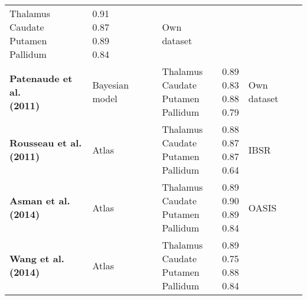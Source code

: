 \documentclass[twoside,fleqn,espcrc2]{elsarticle}
\begin{document}
\begin{table}[h!]
\begin{tabular}{lllll}
\parbox{1.5cm}{Thalamus \\ Caudate \\ Putamen \\ Pallidum  }   &
\parbox{1.0cm}{ 0.91\\0.87\\0.89\\0.84}   &
\parbox{2cm}{Own dataset}\\
\addlinespace
\parbox{3cm}{\textbf{Patenaude et al. \cite{patenaude2011bayesian} \\ (2011)}} &
\parbox{1.5cm}{Bayesian model} &
\parbox{1.5cm}{Thalamus \\ Caudate \\ Putamen \\ Pallidum  }   &
\parbox{1.0cm}{ 0.89\\0.83\\0.88\\0.79}   &
\parbox{2cm}{Own dataset}\\
\addlinespace
\parbox{3cm}{\textbf{Rousseau et al. \cite{rousseau2011supervised}\\ (2011) }} &
\parbox{1.5cm}{Atlas} &
\parbox{1.5cm}{Thalamus \\ Caudate \\ Putamen \\ Pallidum  }   &
\parbox{1.0cm}{ 0.88\\0.87\\0.87\\0.64}   &
\parbox{2cm}{IBSR}\\
\addlinespace
\parbox{3cm}{\textbf{Asman et al. \cite{asman2014groupwise} \\ (2014)}} &
\parbox{1.5cm}{Atlas} &
\parbox{1.5cm}{Thalamus \\ Caudate \\ Putamen \\ Pallidum  }   &
\parbox{1.0cm}{ 0.89\\0.90\\0.89\\0.84}   &
\parbox{2cm}{OASIS}\\
\addlinespace
\parbox{3cm}{\textbf{Wang et al. \cite{wang2014multi} \\ (2014) }} &
\parbox{1.5cm}{Atlas} &
\parbox{1.5cm}{Thalamus \\ Caudate \\ Putamen \\ Pallidum  }   &
\parbox{1.0cm}{ 0.89\\0.75\\0.88\\0.84}   &

\end{tabular}
\end{table}
\end{document}
